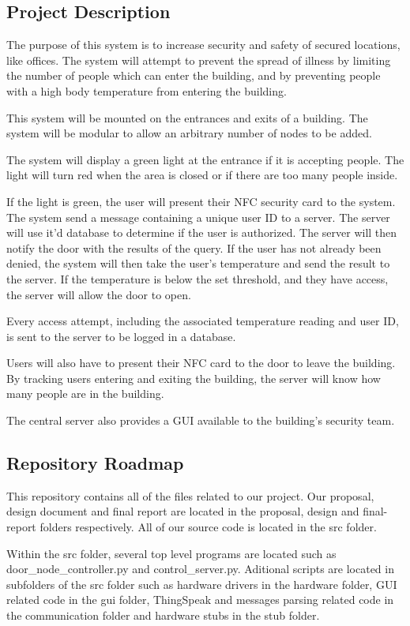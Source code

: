 \subsection{Project Description}

The purpose of this system is to increase security and safety of secured
locations, like offices. The system will attempt to prevent the spread of
illness by limiting the number of people which can enter the building, and by
preventing people with a high body temperature from entering the building.

This system will be mounted on the entrances and exits of a building. The system
will be modular to allow an arbitrary number of nodes to be added.

The system will display a green light at the entrance if it is accepting people.
The light will turn red when the area is closed or if there are too many people
inside.

If the light is green, the user will present their NFC security card to the
system. The system send a message containing a unique user ID to a server. The
server will use it’d database to determine if the user is authorized. The server
will then notify the door with the results of the query. If the user has not
already been denied, the system will then take the user’s temperature and send
the result to the server. If the temperature is below the set threshold, and
they have access, the server will allow the door to open.

Every access attempt, including the associated temperature reading and user ID,
is sent to the server to be logged in a database.

Users will also have to present their NFC card to the door to leave the
building. By tracking users entering and exiting the building, the server will
know how many people are in the building.

The central server also provides a GUI available to the building’s security
team.

\subsection{Repository Roadmap}

This repository contains all of the files related to our project. Our proposal,
design document and final report are located in the proposal, design and
final-report folders respectively. All of our source code is located in the src
folder.

Within the src folder, several top level programs are located such as
door\_node\_controller.py and control\_server.py. Aditional scripts are located
in subfolders of the src folder such as hardware drivers in the hardware folder,
GUI related code in the gui folder, ThingSpeak and messages parsing related
code in the communication folder and hardware stubs in the stub folder.

